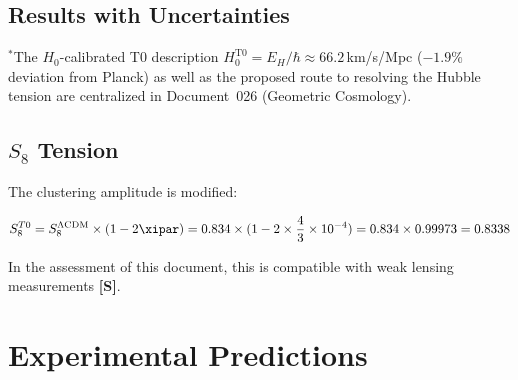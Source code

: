	\subsection{Results with Uncertainties}
	
	\begin{table}[htbp]
		\centering
		\caption{T0 parameter constraints (68\% CL)}
		\label{tab:parameters}
	\end{table}
{$^*$The $H_0$-calibrated T0 description $H_0^{\text{T0}} = E_H/\hbar \approx 66.2\,$km/s/Mpc ($-1.9\%$ deviation from Planck) as well as the proposed route to resolving the Hubble tension are centralized in Document~026 (Geometric Cosmology).}
	
	\subsection{$S_8$ Tension}
	
	The clustering amplitude is modified:
	
	\begin{equation}
		S_8^{T0} = S_8^{\Lambda\text{CDM}} \times (1 - 2\xipar) = 0.834 \times (1 - 2 \times \frac{4}{3} \times 10^{-4}) = 0.834 \times 0.99973 = 0.8338
	\end{equation}
	
	In the assessment of this document, this is compatible with weak lensing measurements \textbf{[S]}.
	
	\section{Experimental Predictions}
	\label{sec:predictions}
	
